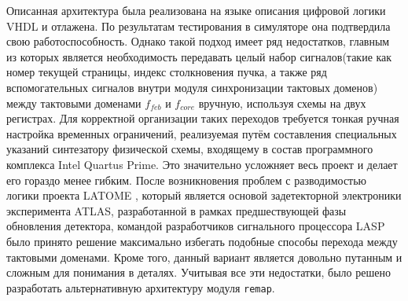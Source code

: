 Описанная архитектура была реализована на языке описания цифровой логики VHDL и отлажена. По результатам тестирования в симуляторе она подтвердила свою работоспособность. Однако такой подход имеет ряд недостатков, главным из которых является необходимость передавать целый набор сигналов(такие как номер текущей страницы, индекс столкновения пучка, а также ряд вспомогательных сигналов внутри модуля синхронизации тактовых доменов) между тактовыми доменами $f_{feb}$ и $f_{core}$ вручную, используя схемы на двух регистрах. Для корректной организации таких переходов требуется тонкая ручная настройка временных ограничений, реализуемая путём составления специальных указаний синтезатору физической схемы, входящему в состав программного комплекса Intel Quartus Prime. Это значительно усложняет весь проект и делает его гораздо менее гибким. После возникновения проблем с разводимостью логики проекта LATOME \parencite{latome}, который является основой задетекторной электроники эксперимента ATLAS, разработанной в рамках предшествующей фазы обновления детектора, командой разработчиков сигнального процессора LASP было принято решение максимально избегать подобные способы перехода между тактовыми доменами. Кроме того, данный вариант является довольно путанным и сложным для понимания в деталях. Учитывая все эти недостатки, было решено разработать альтернативную архитектуру модуля \texttt{remap}.\par
